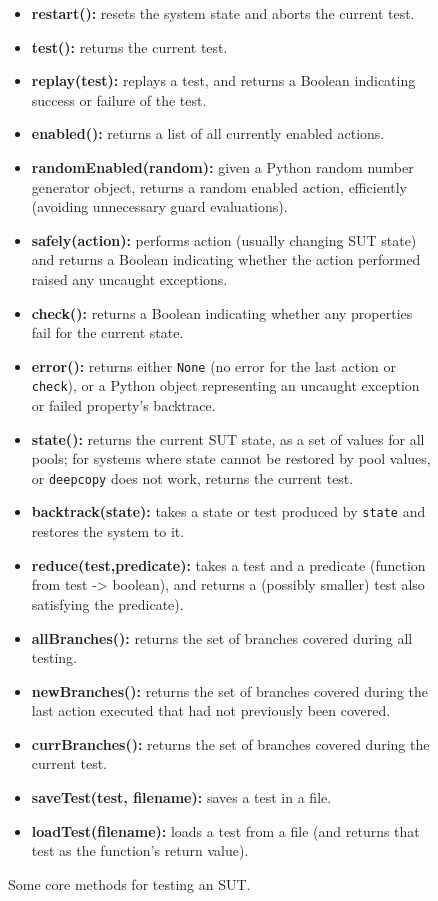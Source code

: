 \begin{figure}
{\scriptsize
\begin{itemize}
\item {\bf restart():}  resets the system state and aborts the current test. 
\item {\bf test():} returns the current test.
\item {\bf replay(test):} replays a test, and returns a Boolean indicating success or failure of the test.
\item {\bf enabled():} returns a list of all currently enabled actions.
\item {\bf randomEnabled(random):}  given a Python random number generator object, returns a random enabled action, efficiently (avoiding unnecessary guard evaluations).
\item {\bf safely(action):} performs action (usually changing SUT state)  and returns a Boolean indicating whether the action performed raised any uncaught exceptions. 
\item {\bf check():} returns a Boolean indicating whether any properties fail for the current state.
\item {\bf error():} returns either {\tt None} (no error for the last action or {\tt check}), or a Python object representing an uncaught exception or failed property's backtrace.
\item {\bf state():} returns the current SUT state, as a set of values for all pools; for systems where state cannot be restored by pool values, or {\tt deepcopy} does not work, returns the current test.
\item {\bf backtrack(state):} takes a state or test produced by {\tt state} and restores the system to it.
\item {\bf reduce(test,predicate):} takes a test and a predicate (function from test -> boolean), and returns a (possibly smaller) test also satisfying the predicate).
\item {\bf allBranches():} returns the set of branches covered during all testing.
\item {\bf newBranches():} returns the set of branches covered during the last action executed that had not previously been covered.
\item {\bf currBranches():} returns the set of branches covered during the current test.
\item {\bf saveTest(test, filename):} saves a test in a file.
\item {\bf loadTest(filename):} loads a test from a file (and returns that test as the function's return value).
\end{itemize} 
}
\caption{Some core methods for testing an SUT.}
\label{methods}
\end{figure}

